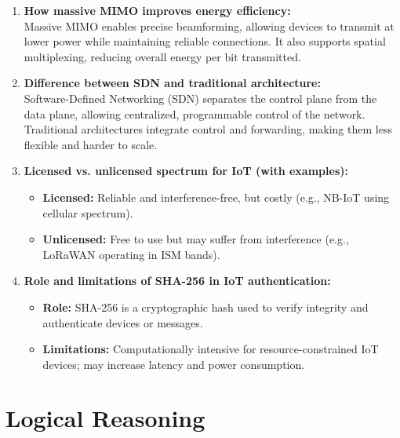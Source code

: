 \documentclass[12pt]{article}
\begin{document}
\begin{enumerate}
    \item \textbf{How massive MIMO improves energy efficiency:} \\
    Massive MIMO enables precise beamforming, allowing devices to transmit at lower power while maintaining reliable connections. It also supports spatial multiplexing, reducing overall energy per bit transmitted.

    \item \textbf{Difference between SDN and traditional architecture:} \\
    Software-Defined Networking (SDN) separates the control plane from the data plane, allowing centralized, programmable control of the network. Traditional architectures integrate control and forwarding, making them less flexible and harder to scale.

    \item \textbf{Licensed vs. unlicensed spectrum for IoT (with examples):}
    \begin{itemize}
        \item \textbf{Licensed:} Reliable and interference-free, but costly (e.g., NB-IoT using cellular spectrum).
        \item \textbf{Unlicensed:} Free to use but may suffer from interference (e.g., LoRaWAN operating in ISM bands).
    \end{itemize}

    \item \textbf{Role and limitations of SHA-256 in IoT authentication:}
    \begin{itemize}
        \item \textbf{Role:} SHA-256 is a cryptographic hash used to verify integrity and authenticate devices or messages.
        \item \textbf{Limitations:} Computationally intensive for resource-constrained IoT devices; may increase latency and power consumption.
    \end{itemize}
\end{enumerate}

\newpage
\section*{Logical Reasoning}
\end{document}
